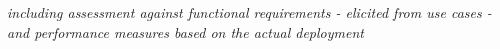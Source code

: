 
{\it including assessment against functional requirements - elicited
  from use cases - and performance measures based on the actual
  deployment}